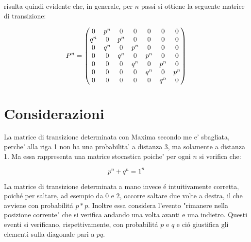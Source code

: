 \documentclass{article}
\begin{document}
risulta quindi evidente che, in generale, per $n$ passi si ottiene la seguente matrice di transizione:

$$P^n=\begin{pmatrix}0 & {p}^{n} & 0 & 0 & 0 & 0 & 0\cr {q}^{n} & 0 & {p}^{n} & 0 & 0 & 0 & 0\cr 0 & {q}^{n} & 0 & {p}^{n} & 0 & 0 & 0\cr 0 & 0 & {q}^{n} & 0 & {p}^{n} & 0 & 0\cr 0 & 0 & 0 & {q}^{n} & 0 & {p}^{n} & 0\cr 0 & 0 & 0 & 0 & {q}^{n} & 0 & {p}^{n}\cr 0 & 0 & 0 & 0 & 0 & {q}^{n} & 0\end{pmatrix}$$ 

\section{Considerazioni}

La matrice di transizione determinata con Maxima secondo me e' sbagliata, perche' alla riga 1 non ha una probabilita' a distanza 3, ma solamente a distanza 1. Ma essa rappresenta una matrice stocastica poiche' per ogni $n$ si verifica che: 

$$ p^n + q^n = 1^n $$

La matrice di transizione determinata a mano invece \'{e} intuitivamente corretta, poich\'{e} per saltare, ad esempio da 0 e 2, occorre saltare due volte a destra, il che avviene con probabilit\'{a} $p*p$. Inoltre essa considera l'evento "rimanere nella posizione corrente" che si verifica andando una volta avanti e una indietro. Questi eventi si verificano, rispettivamente, con probabilit\'{a} $p$ e $q$ e ci\'{o} giustifica gli elementi sulla diagonale pari a $pq$.
\end{document}
